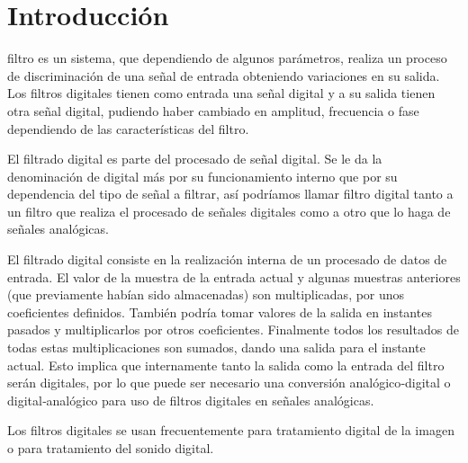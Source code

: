 \section{Introducción}
     filtro es un sistema, que dependiendo de algunos parámetros, realiza un proceso de discriminación de una señal de entrada obteniendo  variaciones en su salida. Los filtros digitales tienen como entrada una señal digital y a su salida tienen otra señal digital, pudiendo haber cambiado en amplitud, frecuencia o fase dependiendo de las características del filtro.

    El filtrado digital es parte del procesado de señal digital. Se le da la denominación de digital más por su funcionamiento interno que por su dependencia del tipo de señal a filtrar, así podríamos llamar filtro digital tanto a un filtro que realiza el procesado de señales digitales como a otro que lo haga de señales analógicas.

    El filtrado digital consiste en la realización interna de un procesado de datos de entrada. El valor de la muestra de la entrada actual y algunas muestras anteriores (que previamente habían sido almacenadas) son multiplicadas, por unos coeficientes definidos. También podría tomar valores de la salida en instantes pasados y multiplicarlos por otros coeficientes. Finalmente todos los resultados de todas estas multiplicaciones son sumados, dando una salida para el instante actual. Esto implica que internamente tanto la salida como la entrada del filtro serán digitales, por lo que puede ser necesario una conversión analógico‐digital o digital‐analógico para uso de filtros digitales en señales analógicas.

    Los filtros digitales se usan frecuentemente para tratamiento digital de la imagen o para tratamiento del sonido digital.

    
    
    
    

